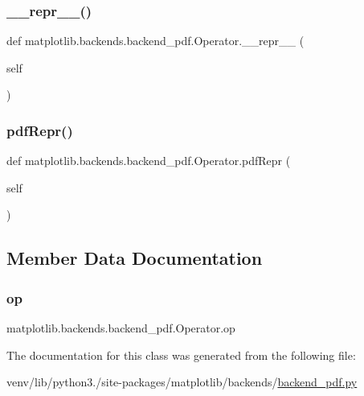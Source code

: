 \subsubsection{\texorpdfstring{\+\_\+\+\_\+repr\+\_\+\+\_\+()}{\_\_repr\_\_()}}
{\footnotesize\ttfamily def matplotlib.\+backends.\+backend\+\_\+pdf.\+Operator.\+\_\+\+\_\+repr\+\_\+\+\_\+ (\begin{DoxyParamCaption}\item[{}]{self }\end{DoxyParamCaption})}

\mbox{\label{classmatplotlib_1_1backends_1_1backend__pdf_1_1Operator_a56509ed1ec71c2d9ff7ea0d46a872fc3}} 
\subsubsection{\texorpdfstring{pdf\+Repr()}{pdfRepr()}}
{\footnotesize\ttfamily def matplotlib.\+backends.\+backend\+\_\+pdf.\+Operator.\+pdf\+Repr (\begin{DoxyParamCaption}\item[{}]{self }\end{DoxyParamCaption})}



\subsection{Member Data Documentation}
\mbox{\label{classmatplotlib_1_1backends_1_1backend__pdf_1_1Operator_a8c8222c629a98cb2e62124587f8581a8}} 
\subsubsection{\texorpdfstring{op}{op}}
{\footnotesize\ttfamily matplotlib.\+backends.\+backend\+\_\+pdf.\+Operator.\+op}



The documentation for this class was generated from the following file\+:\begin{DoxyCompactItemize}
\item 
venv/lib/python3./site-\/packages/matplotlib/backends/\hyperlink{backend__pdf_8py}{backend\+\_\+pdf.\+py}\end{DoxyCompactItemize}
